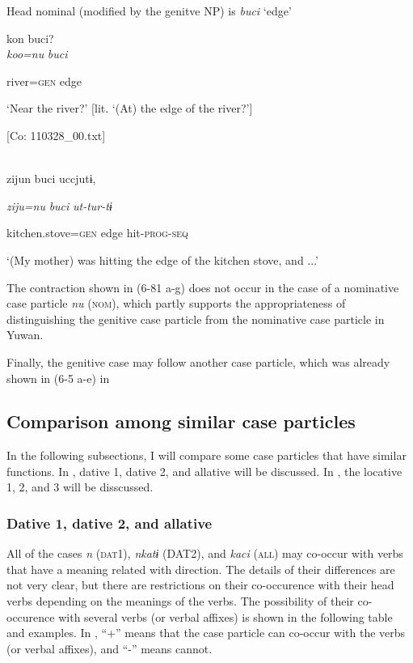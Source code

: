   Head nominal (modified by the genitve NP) is \textit{buci} ‘edge’

\ex  {\TM}  kon  buci?\\

      \textit{koo=nu}  \textit{buci}

      river=\textsc{gen}  edge

\glt ‘Near the river?’ [lit. ‘(At) the edge of the river?’]

      [Co: 110328\_00.txt]
\z

\\

{\TM}
\gll zijun  buci  uccjutɨ,

      \textit{ziju=nu}  \textit{buci}  \textit{ut-tur-tɨ}

      kitchen.stove=\textsc{gen}  edge  hit-\textsc{prog}-\textsc{seq}

\glt ‘(My mother) was hitting the edge of the kitchen stove, and ...’

The contraction shown in (6-81 a-g) does not occur in the case of a nominative case particle \textit{nu} (\textsc{nom}), which partly supports the appropriateness of distinguishing the genitive case particle from the nominative case particle in Yuwan.

  Finally, the genitive case may follow another case particle, which was already shown in (6-5 a-e) in 

\subsection{Comparison among similar case particles}

In the following subsections, I will compare some case particles that have similar functions. In , dative 1, dative 2, and allative will be discussed. In , the locative 1, 2, and 3 will be disscussed.

\subsubsection{Dative 1, dative 2, and allative}

All of the cases \textit{n} (\textsc{dat}1), \textit{nkatɨ} (DAT2), and \textit{kaci} (\textsc{all}) may co-occur with verbs that have a meaning related with direction. The details of their differences are not very clear, but there are restrictions on their co-occurence with their head verbs depending on the meanings of the verbs. The possibility of their co-occurence with several verbs (or verbal affixes) is shown in the following table and examples. In , “+” means that the case particle can co-occur with the verbs (or verbal affixes), and “-” means cannot.


